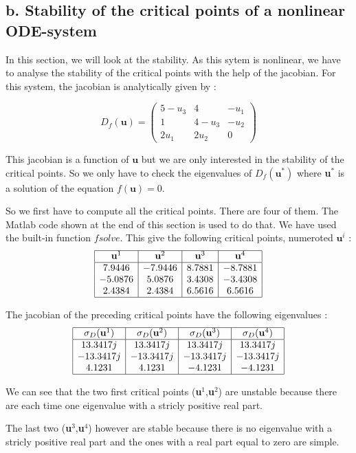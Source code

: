 \subsection*{b. Stability of the critical points of a nonlinear ODE-system}

In this section, we will look at the stability. As this sytem is nonlinear, we have to analyse the stability of the critical points with the help of the jacobian. For this system, the jacobian is analytically given by : 

$$D_f(\textbf{u}) = \left(\begin{array}{ccc}
5-u_3 & 4 & -u_1 \\ 
1 & 4-u_3 & -u_2 \\ 
2u_1 & 2u_2 & 0
\end{array} \right)$$

This jacobian is a function of $\textbf{u}$ but we are only interested in the stability of the critical points. So we only have to check the eigenvalues of $D_f(\textbf{u}^*)$ where \textbf{u$^*$} is a solution of the equation $f(\textbf{u})=0$.

So we first have to compute all the critical points. There are four of them. The Matlab code shown at the end of this section is used to do that. We have used the built-in function $fsolve$. This give the following critical points, numeroted $\textbf{u}^i$ : 
$$\begin{array}{|c|c|c|c|}
\hline
\textbf{u}^1 & \textbf{u}^2 & \textbf{u}^3 & \textbf{u}^4 \\ 
\hline
7.9446 & -7.9446 & 8.7881 & -8.7881 \\ 
-5.0876 & 5.0876 & 3.4308 & -3.4308 \\ 
2.4384 & 2.4384 & 6.5616 & 6.5616\\
\hline
\end{array} $$

The jacobian of the preceding critical points have the following eigenvalues : 
$$\begin{array}{|c|c|c|c|}
\hline
\sigma_D(\textbf{u}^1) & \sigma_D(\textbf{u}^2) & \sigma_D(\textbf{u}^3) & \sigma_D(\textbf{u}^4) \\ 
\hline
13.3417j & 13.3417j & 13.3417j & 13.3417j \\ 
-13.3417j & -13.3417j & -13.3417j & -13.3417j \\ 
4.1231 & 4.1231 & -4.1231 & -4.1231\\
\hline
\end{array} $$

We can see that the two first critical points (\textbf{u}$^1$,\textbf{u}$^2$) are unstable because there are each time one eigenvalue with a stricly positive real part.

The last two (\textbf{u}$^3$,\textbf{u}$^4$) however are stable because there is no eigenvalue with a stricly positive real part and the ones with a real part equal to zero are simple.

